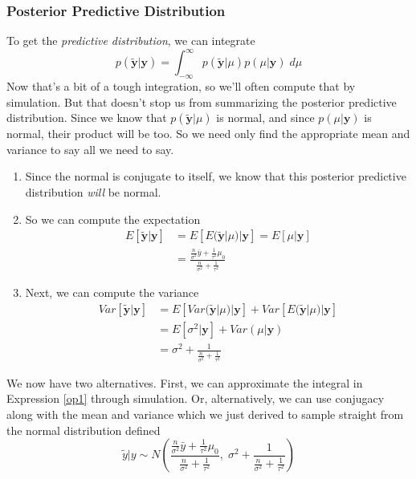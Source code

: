 \documentclass[12pt]{article}
\begin{document}
\newpage
\subsubsection{Posterior Predictive Distribution}
To get the \emph{predictive distribution}, we can integrate
\begin{equation}
   \label{op1}
    p(\tilde{\mathbf{y}} | \mathbf{y}) = \int^\infty_{-\infty}
      p(\tilde{\mathbf{y}} | \mu) p( \mu | \mathbf{y}) \; d\mu 
\end{equation}
Now that's a bit of a tough integration, so we'll often compute
that by simulation. But that doesn't stop us from summarizing the
posterior predictive distribution. Since we know that 
$p(\tilde{\mathbf{y}} | \mu)$ is normal, and since $p(\mu | \mathbf{y})$
is normal, their product will be too. So we need only find the 
appropriate mean and variance to say all we need to say.
\begin{enumerate}
   \item{Since the normal is conjugate to itself, we know that this 
      posterior predictive distribution \emph{will} be normal.}
   \item{So we can compute the expectation
      \begin{align*}
	 E[\tilde{\mathbf{y}} | \mathbf{y} ] &=  
	    E[ E(\tilde{\mathbf{y}} | \mu) |  \mathbf{y} ]  
	    = E[\mu | \mathbf{y}] 
	 \\
	 &= \frac{\frac{n}{\sigma^2} \bar{y}
	 + \frac{1}{\tau^2} \mu_0}{\frac{n}{\sigma^2} + \frac{1}{\tau^2}}
      \end{align*}
	 }
   \item{Next, we can compute the variance
      \begin{align*}
	 Var[\tilde{\mathbf{y}} | \mathbf{y} ] &=  
	    E[ Var(\tilde{\mathbf{y}} | \mu) |  \mathbf{y} ]  
	    + Var[ E(\tilde{\mathbf{y}} | \mu) | \mathbf{y} ]
	 \\
	 &= E[ \sigma^2 | \mathbf{y} ] + Var( \mu | \mathbf{y}) 
	 \\
	 &= \sigma^2 + \frac{1}{\frac{n}{\sigma^2} + \frac{1}{\tau^2}}
      \end{align*}
	 }
\end{enumerate}
We now have two alternatives. First, we can approximate the integral
in Expression \ref{op1} through simulation. Or, alternatively, we
can use conjugacy along with the mean and variance which we just derived
to sample straight from the normal distribution defined
\[ \tilde{y} | y\sim N\left(\frac{\frac{n}{\sigma^2} \bar{y}
      + \frac{1}{\tau^2} \mu_0}{\frac{n}{\sigma^2} + \frac{1}{\tau^2}},
       \; \sigma^2 + \frac{1}{\frac{n}{\sigma^2} + 
      \frac{1}{\tau^2}}\right) \]
\end{document}
